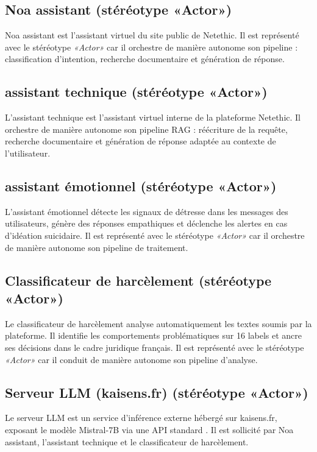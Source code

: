 \subsection{Noa assistant (stéréotype «Actor»)}

Noa assistant est l'assistant virtuel du site public de Netethic.
Il est représenté avec le stéréotype \textit{«Actor»} car il orchestre de manière autonome
son pipeline : classification d'intention, recherche documentaire et génération de réponse.

\subsection{assistant technique (stéréotype «Actor»)}

L'assistant technique est l'assistant virtuel interne de la plateforme Netethic.
Il orchestre de manière autonome son pipeline RAG : réécriture de la requête, recherche
documentaire et génération de réponse adaptée au contexte de l'utilisateur.

\subsection{assistant émotionnel (stéréotype «Actor»)}

L'assistant émotionnel détecte les signaux de détresse dans les messages des utilisateurs,
génère des réponses empathiques et déclenche les alertes en cas d'idéation suicidaire.
Il est représenté avec le stéréotype \textit{«Actor»} car il orchestre de manière autonome
son pipeline de traitement.

\subsection{Classificateur de harcèlement (stéréotype «Actor»)}

Le classificateur de harcèlement analyse automatiquement les textes soumis par la plateforme.
Il identifie les comportements problématiques sur 16 labels et ancre ses décisions
dans le cadre juridique français.
Il est représenté avec le stéréotype \textit{«Actor»} car il conduit de manière autonome
son pipeline d'analyse.

\subsection{Serveur LLM (kaisens.fr) (stéréotype «Actor»)}

Le serveur LLM est un service d'inférence externe hébergé sur kaisens.fr, exposant le modèle
Mistral-7B \cite{mistral2023} via une API standard \cite{vllm2023}.
Il est sollicité par Noa assistant, l'assistant technique et le classificateur de harcèlement.

